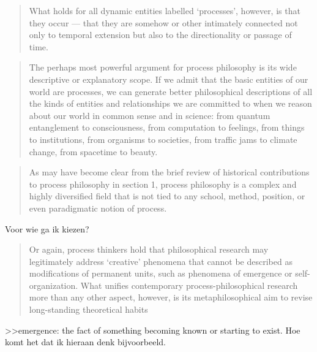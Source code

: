 \documentclass[a4paper]{Thesis}
\begin{document}
\begin{quotation}
	What holds for all dynamic entities labelled ‘processes’, however, is that they occur — that they are somehow or other intimately connected not only to temporal extension but also to the directionality or passage of time.
\end{quotation}

\begin{quotation}
	The perhaps most powerful argument for process philosophy is its wide descriptive or explanatory scope. 
	If we admit that the basic entities of our world are processes, we can generate better philosophical descriptions of all the kinds of entities and relationships we are committed to when we reason about our world in common sense and in science: from quantum entanglement to consciousness, from computation to feelings, from things to institutions, from organisms to societies, from traffic jams to climate change, from spacetime to beauty. 
\end{quotation}

\begin{quotation}
	As may have become clear from the brief review of historical contributions to process philosophy in section 1, process philosophy is a complex and highly diversified field that is not tied to any school, method, position, or even paradigmatic notion of process.
\end{quotation} 
Voor wie ga ik kiezen?

\begin{quotation}
	Or again, process thinkers hold that philosophical research may legitimately address ‘creative’ phenomena that cannot be described as modifications of permanent units, such as phenomena of emergence or self-organization. What unifies contemporary process-philosophical research more than any other aspect, however, is its metaphilosophical aim to revise long-standing theoretical habits
\end{quotation}
>>emergence:  the fact of something becoming known or starting to exist.
Hoe komt het dat ik hieraan denk bijvoorbeeld.
\end{document}
